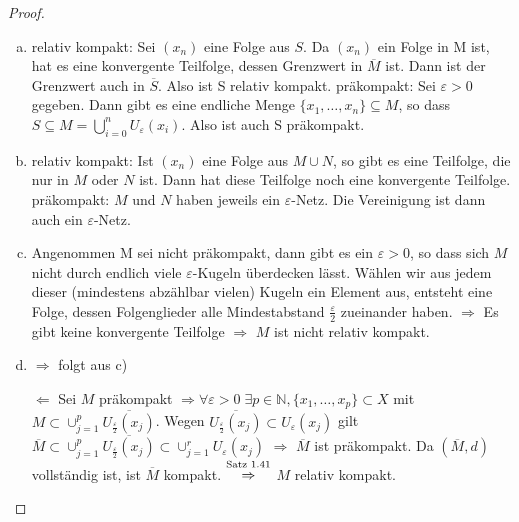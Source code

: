 \documentclass[ngerman]{report}
\theoremstyle{plain}%
\theoremstyle{definition}%
\theoremstyle{myStyle}
\newcommand{\N}{\mathbb{N}}
\newcommand{\df}[1][]{%
	\overset{#1}{\Rightarrow}
}
\newcommand{\qmarks}[1]{#1}
\begin{document}
	\begin{proof}
		\begin{enumerate}[a)]

			\item  relativ kompakt: Sei $(x_n)$ eine Folge aus $S$. Da $(x_n)$ ein Folge in M ist, hat es eine konvergente Teilfolge, dessen Grenzwert in $\overline{M}$ ist. Dann ist der Grenzwert auch in $\overline{S}$. Also ist S relativ kompakt. 
				präkompakt: Sei $\varepsilon>0$ gegeben. Dann gibt es eine endliche Menge $\{x_1,\dots,x_n\}\subseteq M$, so dass $S\subseteq M = \bigcup^n_{i=0}U_\varepsilon(x_i)$. Also ist auch S präkompakt.
			
			\item  relativ kompakt: Ist $(x_n)$ eine Folge aus $M\cup N$, so gibt es eine Teilfolge, die nur in $M$ oder $N$ ist. Dann hat diese Teilfolge noch eine konvergente Teilfolge.
				präkompakt: $M$ und $N$ haben jeweils ein $\varepsilon$-Netz. Die Vereinigung ist dann auch ein $\varepsilon$-Netz.
				
			\item  Angenommen M sei nicht präkompakt, dann gibt es ein $\varepsilon>0$, so dass sich $M$ nicht durch endlich viele $\varepsilon$-Kugeln überdecken lässt. Wählen wir aus jedem dieser  (mindestens abzählbar vielen) Kugeln ein Element aus, entsteht eine Folge, dessen Folgenglieder alle Mindestabstand $\frac{\varepsilon}{2}$ zueinander haben. $\df$ Es gibt keine konvergente Teilfolge $\df$ $M$ ist nicht relativ kompakt.
			
			\item  $\qmarks{\df}$ folgt aus c) \par
				$\qmarks{\Leftarrow}$ Sei $M$ präkompakt $\df \forall \varepsilon > 0\; \exists p\in\N, \{x_1,\dots,x_p\} \subset X$ mit $M \subset \cup_{j=1}^p \overline{ U_{\frac{\varepsilon}{2}}(x_j)}$. 
				Wegen $\overline{U_{\frac{\varepsilon}{2}}(x_j)} \subset U_{{\varepsilon}}(x_j)$ gilt
				$\overline{M} \subset \cup_{j=1}^p \overline{U_{\frac{\varepsilon}{2}}(x_j)} \subset \cup_{j=1}^r U_{\varepsilon}(x_j)$
				$\df$ $\overline{M}$ ist präkompakt. Da $(\overline{M},d)$ vollständig ist, ist $\overline{M}$ kompakt. $\overset{\text{Satz 1.41}}{\df}$ $M$ relativ kompakt.
		\end{enumerate}
	\end{proof}
\end{document}
